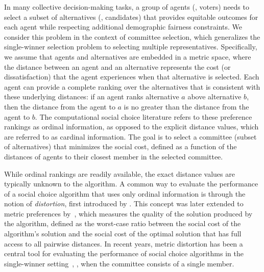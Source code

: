 In many collective decision-making tasks, a group of agents (\eg, voters) needs to select a subset of alternatives (\eg, candidates) that provides equitable outcomes for each agent while respecting additional demographic fairness constraints.
We consider this problem in the context of committee selection, which generalizes the single-winner selection problem to selecting multiple representatives.
Specifically, we assume that agents and alternatives are embedded in a metric space, where the distance between an agent and an alternative represents the cost (or dissatisfaction) that the agent experiences when that alternative is selected. 
Each agent can provide a complete ranking over the alternatives that is consistent with these underlying distances: if an agent ranks alternative $a$ above alternative $b$, then the distance from the agent to $a$ is no greater than the distance from the agent to $b$. 
The computational social choice literature refers to these preference rankings as ordinal information, as opposed to the explicit distance values, which are referred to as cardinal information. 
The goal is to select a committee (subset of alternatives) that minimizes the social cost, defined as a function of the distances of agents to their closest member in the selected committee. 

While ordinal rankings are readily available, the exact distance values are typically unknown to the algorithm.
A common way to evaluate the performance of a social choice algorithm that uses only ordinal information is through the notion of \emph{distortion}, first introduced by \citet{procaccia2006distortion}.
This concept was later extended to metric preferences by~\cite{anshelevich2018approximating}, which measures the quality of the solution produced by the algorithm, defined as the worst-case ratio between the social cost of the algorithm's solution and the social cost of the optimal solution that has full access to all pairwise distances.
In recent years, metric distortion has been a central tool for evaluating the performance of social choice algorithms in the single-winner setting~\cite{anshelevich2018approximating, munagala2019improved, gkatzelis2020resolving, kizilkaya2022plurality, kizilkaya2023generalized, 
charikar2022metric, fain2019random,
charikar2024breaking}, \ie, when the committee consists of a single member.



